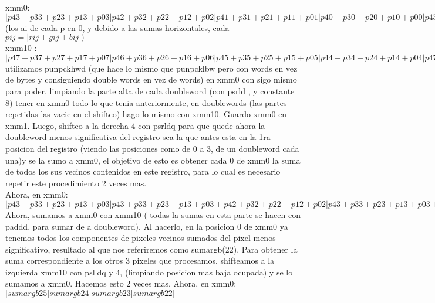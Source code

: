 \documentclass[a4paper]{article}
\begin{document}
 xmm0: $|p43+p33+p23+p13+p03|p42+p32+p22+p12+p02|p41+p31+p21+p11+p01|p40+p30+p20+p10+p00|p43+p33+p23+p13+p03|p42+p32+p22+p12+p02|p41+p31+p21+p11+p01|p40+p30+p20+p10+p00|$ (los ai de cada p en 0, y debido a las sumas horizontales, cada $pij =  |rij+gij+bij|)$
 \hfill \break \\
 xmm10 :$|p47+p37+p27+p17+p07|p46+p36+p26+p16+p06|p45+p35+p25+p15+p05|p44+p34+p24+p14+p04|p47+p37+p27+p17+p07|p46+p36+p26+p16+p06|p45+p35+p25+p15+p05|p44+p34+p24+p14+p04|$
 \hfill \break  \\
 utilizamos punpckhwd (que hace lo mismo que punpcklbw pero con words en vez de bytes y consiguiendo double words en vez de words) en xmm0 con sigo mismo para poder, limpiando la parte alta de cada doubleword (con psrld , y constante 8) tener en xmm0 todo lo que tenia anteriormente,  en doublewords (las partes repetidas las vacie en el shifteo) hago lo mismo con xmm10.
 \hfill \break
 Guardo xmm0 en xmm1. Luego, shifteo a la derecha 4 con psrldq para que quede ahora la doubleword menos significativa del registro sea la que antes esta en la 1ra posicion del registro (viendo las posiciones como  de 0 a 3, de un doubleword cada una)y se la sumo a xmm0, el objetivo de esto es obtener cada  0 de xmm0  la suma de todos los sus vecinos contenidos en este registro, para lo cual es necesario repetir este procedimiento  2 veces mas.
 \hfill \break
 \\
Ahora, en xmm0:$|p43+p33+p23+p13+p03|p43+p33+p23+p13+p03+p42+p32+p22+p12+p02|p43+p33+p23+p13+p03+p42+p32+p22+p12+p02+p41+p31+p21+p11+p01|p43+p33+p23+p13+p03+p42+p32+p22+p12+p02+p41+p31+p21+p11+p01+p40+p30+p20+p10+p00|$
\\
\hfill \break
Ahora, sumamos a xmm0 con xmm10 ( todas la sumas en esta parte se hacen con paddd, para sumar de a doubleword). Al hacerlo, en la posicion 0 de xmm0 ya tenemos todos los componentes de pixeles vecinos sumados del pixel menos significativo, resultado al que nos referiremos como sumargb(22).
\hfill \break
 Para obtener la suma correspondiente a los otros 3 pixeles que procesamos,  shifteamos a la izquierda xmm10 con pslldq y 4, (limpiando posicion mas baja ocupada) y se lo sumamos a xmm0. Hacemos esto 2 veces mas.
 \hfill \break
Ahora, en xmm0:$ |sumargb25|sumargb24|sumargb23|sumargb22|$
\hfill \break
\end{document}
